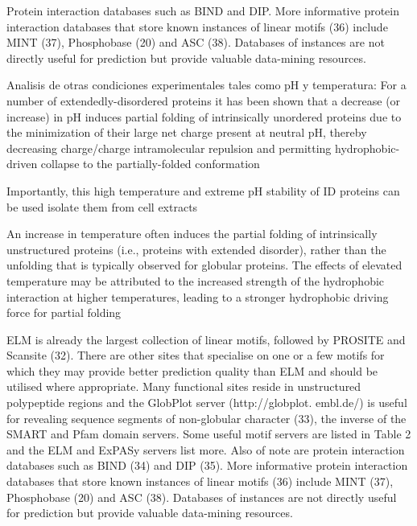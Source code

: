 Protein interaction databases such as BIND and DIP. More informative protein interaction databases that store known instances of linear motifs (36) include MINT (37), Phosphobase (20) and ASC (38). 
Databases of instances are not directly useful for prediction but provide valuable data-mining resources.



Analisis de otras condiciones experimentales tales como pH y temperatura:
For a number of extendedly-disordered proteins it has been shown that a decrease (or increase) in pH induces partial folding of intrinsically unordered proteins due to the minimization of
their large net charge present at neutral pH, thereby decreasing charge/charge intramolecular repulsion and permitting hydrophobic-driven collapse to the partially-folded conformation

Importantly, this high temperature and extreme pH stability of ID proteins can be used isolate them from cell extracts

An increase in temperature often induces the partial folding of intrinsically unstructured
proteins (i.e., proteins with extended disorder), rather than the unfolding that is typically
observed for globular proteins. The effects of elevated temperature may be attributed to the
increased strength of the hydrophobic interaction at higher temperatures, leading to a stronger
hydrophobic driving force for partial folding




ELM is already the largest collection of linear motifs, followed
by PROSITE and Scansite (32). There are other sites that
specialise on one or a few motifs for which they may provide
better prediction quality than ELM and should be utilised
where appropriate. Many functional sites reside in unstructured
polypeptide regions and the GlobPlot server (http://globplot.
embl.de/) is useful for revealing sequence segments of
non-globular character (33), the inverse of the SMART and
Pfam domain servers. Some useful motif servers are listed in
Table 2 and the ELM and ExPASy servers list more. Also of
note are protein interaction databases such as BIND (34) and
DIP (35). More informative protein interaction databases that
store known instances of linear motifs (36) include MINT (37),
Phosphobase (20) and ASC (38). Databases of instances are
not directly useful for prediction but provide valuable
data-mining resources.